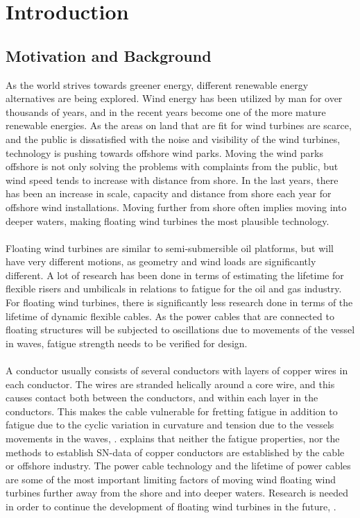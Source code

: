 \chapter{Introduction}
\label{chap:introduction}
\section{Motivation and Background}
As the world strives towards greener energy, different renewable energy alternatives are being explored. Wind energy has been utilized by man for over thousands of years, and in the recent years become one of the more mature renewable energies. As the areas on land that are fit for wind turbines are scarce, and the public is dissatisfied with the noise and visibility of the wind turbines, technology is pushing towards offshore wind parks. Moving the wind parks offshore is not only solving the problems with complaints from the public, but wind speed tends to increase with distance from shore. In the last years, there has been an increase in scale, capacity and distance from shore each year for offshore wind installations. Moving further from shore often implies moving into deeper waters, making floating wind turbines the most plausible technology.\\\\ Floating wind turbines are similar to semi-submersible oil platforms, but will have very different motions, as geometry and wind loads are significantly different. A lot of research has been done in terms of estimating the lifetime for flexible risers and umbilicals in relations to fatigue for the oil and gas industry. For floating wind turbines, there is significantly less research done in terms of the lifetime of dynamic flexible cables. As the power cables that are connected to floating structures will be subjected to oscillations due to movements of the vessel in waves, fatigue strength needs to be verified for design.\\\\ A conductor usually consists of several conductors with layers of copper wires in each conductor. The wires are stranded helically around a core wire, and this causes contact both between the conductors, and within each layer in the conductors. This makes the cable vulnerable for fretting fatigue in addition to fatigue due to the cyclic variation in curvature and tension due to the vessels movements in the waves,  \cite{s300}. \cite{Karlsen2010} explains that neither the fatigue properties, nor the methods to establish SN-data of copper conductors are established by the cable or offshore industry.  The power cable technology and the lifetime of power cables are some of the most important limiting factors of moving wind floating wind turbines further away from the shore and into deeper waters.   Research is needed in order to continue the development of floating wind turbines in the future, \cite{Thies2012}.
